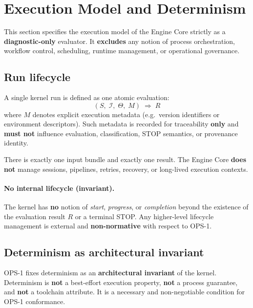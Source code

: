 ﻿\section{Execution Model and Determinism}

This section specifies the execution model of the Engine Core strictly as a
\textbf{diagnostic-only} evaluator.
It \textbf{excludes} any notion of process orchestration, workflow control,
scheduling, runtime management, or operational governance.

\subsection{Run lifecycle}

A single kernel run is defined as one atomic evaluation:
\[
(S,\;\mathcal{I},\;\Theta,\;M)\;\Rightarrow\;R
\]
where $M$ denotes explicit execution metadata
(e.g.\ version identifiers or environment descriptors).
Such metadata is recorded for traceability \textbf{only} and
\textbf{must not} influence evaluation, classification, STOP semantics,
or provenance identity.

There is exactly one input bundle and exactly one result.
The Engine Core \textbf{does not} manage sessions, pipelines, retries,
recovery, or long-lived execution contexts.

\paragraph{No internal lifecycle (invariant).}
The kernel has \textbf{no} notion of \emph{start}, \emph{progress},
or \emph{completion} beyond the existence of the evaluation result $R$
or a terminal STOP.
Any higher-level lifecycle management is external and
\textbf{non-normative} with respect to OPS-1.

\subsection{Determinism as architectural invariant}

OPS-1 fixes determinism as an \textbf{architectural invariant} of the kernel.
Determinism is \textbf{not} a best-effort execution property,
\textbf{not} a process guarantee,
and \textbf{not} a toolchain attribute.
It is a necessary and non-negotiable condition for OPS-1 conformance.


